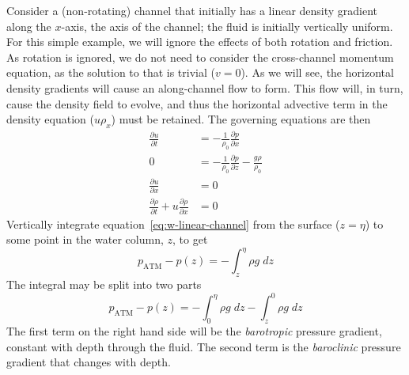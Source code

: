 \documentclass[11pt]{report}
\numberwithin{equation}{section}
\begin{document}
Consider a (non-rotating) channel that initially has a linear density gradient along the $x$-axis, the axis of the channel; the fluid is initially vertically uniform.  For this simple example, we will ignore the effects of both rotation and friction.  As rotation is ignored, we do not need to consider the cross-channel momentum equation, as the solution to that is trivial ($v=0$).  As we will see, the horizontal density gradients will cause an along-channel flow to form.  This flow will, in turn, cause the density field to evolve, and thus the horizontal advective term in the density equation ($u \rho_x$) must be retained.  The governing equations are then
\begin{align}
    \frac{\partial u}{\partial t} 
        &= -\frac{1}{\rho_0}\frac{\partial p}{\partial x} \label{eq:u-linear-channel} \\
    0  &= -\frac{1}{\rho_0}\frac{\partial p}{\partial z} 
                   -\frac{g \rho}{\rho_0} \label{eq:w-linear-channel} \\
    \frac{\partial u}{\partial x} &= 0 \label{eq:cont-linear-channel}\\
    \frac{\partial \rho}{\partial t} + u\frac{\partial \rho}{\partial x} &= 0 \label{eq:dens-linear-channel}
\end{align}
Vertically integrate equation~\ref{eq:w-linear-channel} from the surface ($z=\eta$) to some point in the water column, $z$, to get
\begin{equation}
    p_{\mathrm{ATM}} - p(z) = - \int_z^\eta \rho g\;dz
\end{equation}
The integral may be split into two parts
\begin{equation}
    p_{\mathrm{ATM}} - p(z) = - \int_0^\eta \rho g\;dz - \int_z^0 \rho g\;dz
\end{equation}
The first term on the right hand side will be the \emph{barotropic} pressure gradient, constant with depth through the fluid.  The second term is the \emph{baroclinic} pressure gradient that changes with depth.  
\end{document}
